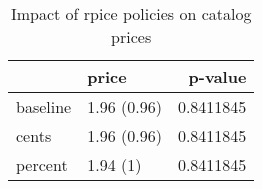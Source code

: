 \begin{table}[!h]

\caption{\label{tab:price_catalog}Impact of rpice policies on catalog prices}
\centering
\begin{tabular}[t]{llr}
\toprule
 & price & p-value\\
\midrule
baseline & 1.96 (0.96) & 0.8411845\\
cents & 1.96 (0.96) & 0.8411845\\
percent & 1.94 (1) & 0.8411845\\
\bottomrule
\end{tabular}
\end{table}
